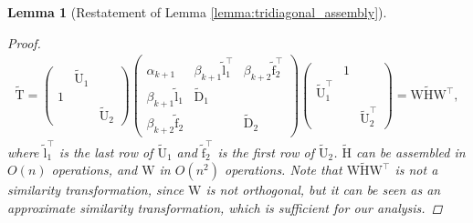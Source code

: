 \documentclass{article}
\newtheorem{lemma}{Lemma}[section]
\newcommand\vecftilde{\widetilde{\boldsymbol{\mathrm{f}}}}
\newcommand\vecltilde{\widetilde{\boldsymbol{\mathrm{l}}}}
\newcommand\matW{\boldsymbol{\mathrm{W}}}
\newcommand\matDtilde{\widetilde{\boldsymbol{\mathrm{D}}}}
\newcommand\matHtilde{\widetilde{\boldsymbol{\mathrm{H}}}}
\newcommand\matTtilde{\widetilde{\boldsymbol{\mathrm{T}}}}
\newcommand\matUtilde{\widetilde{\boldsymbol{\mathrm{U}}}}
\begin{document}
\begin{lemma}[Restatement of Lemma \ref{lemma:tridiagonal_assembly}]
\begin{proof}
\begin{align*}
            \matTtilde
            =
            \begin{pmatrix}
                & \matUtilde_1 & \\
                1 & & \\
                & & \matUtilde_2
            \end{pmatrix}    
            \begin{pmatrix}
                \alpha_{k+1}& \beta_{k+1}\vecltilde_1^\top   & \beta_{k+2}\vecftilde_2^\top\\
                \beta_{k+1}\vecltilde_1 & \matDtilde_1 & \\
                 \beta_{k+2}\vecftilde_2& & \matDtilde_2
            \end{pmatrix}
            \begin{pmatrix}
                & 1 & \\
                \matUtilde_1^\top & & \\
                & & \matUtilde_2^\top
            \end{pmatrix}
            =
            \matW\matHtilde\matW^\top,
        \end{align*}
        where $\vecltilde_1^\top$ is the last row of $\matUtilde_1$ and $\vecftilde_2^\top$ is the first row of $\matUtilde_2$. $\matHtilde$ can be assembled in $O(n)$ operations, and $\matW$ in $O(n^2)$ operations. 
        Note that $\matW\matHtilde\matW^\top$ is not a similarity transformation, since $\matW$ is not orthogonal, but it can be seen as an approximate similarity transformation, which is sufficient for our analysis. 
        

\end{proof}
\end{lemma}
\end{document}
